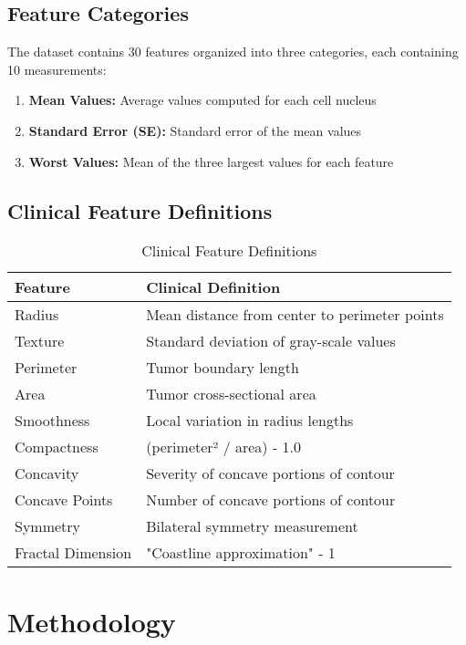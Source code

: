 \documentclass[12pt,a4paper]{article}
\begin{document}
\subsection{Feature Categories}

The dataset contains 30 features organized into three categories, each containing 10 measurements:

\begin{enumerate}
    \item \textbf{Mean Values:} Average values computed for each cell nucleus
    \item \textbf{Standard Error (SE):} Standard error of the mean values
    \item \textbf{Worst Values:} Mean of the three largest values for each feature
\end{enumerate}

\subsection{Clinical Feature Definitions}

\begin{table}[H]
\centering
\caption{Clinical Feature Definitions}
\label{tab:features}
\begin{tabular}{@{}p{3cm}p{10cm}@{}}
\toprule
\textbf{Feature} & \textbf{Clinical Definition} \\
\midrule
Radius & Mean distance from center to perimeter points \\
Texture & Standard deviation of gray-scale values \\
Perimeter & Tumor boundary length \\
Area & Tumor cross-sectional area \\
Smoothness & Local variation in radius lengths \\
Compactness & (perimeter² / area) - 1.0 \\
Concavity & Severity of concave portions of contour \\
Concave Points & Number of concave portions of contour \\
Symmetry & Bilateral symmetry measurement \\
Fractal Dimension & "Coastline approximation" - 1 \\
\bottomrule
\end{tabular}
\end{table}

\section{Methodology}
\end{document}
